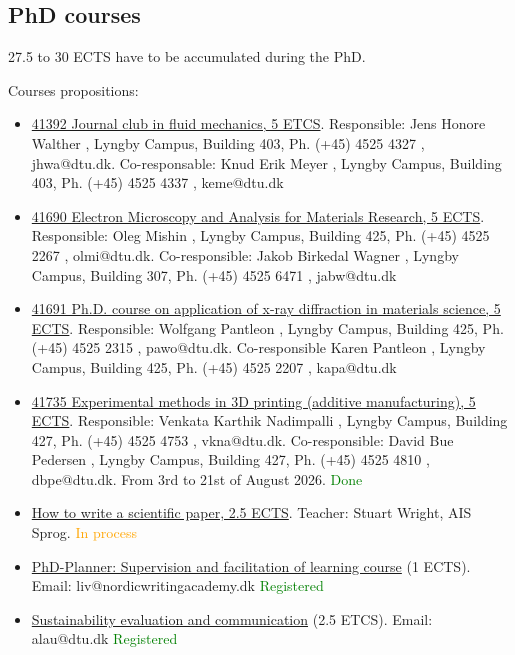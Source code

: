 \documentclass[../main.tex]{subfiles}
\begin{document}
\subsection{PhD courses}

27.5 to 30 ECTS have to be accumulated during the PhD.

Courses propositions:
\begin{itemize}
    \item \href{https://kurser.dtu.dk/course/41392}{41392 Journal club in fluid mechanics, 5 ETCS}. Responsible: Jens Honore Walther , Lyngby Campus, Building 403, Ph. (+45) 4525 4327 , jhwa@dtu.dk. Co-responsable: 	Knud Erik Meyer , Lyngby Campus, Building 403, Ph. (+45) 4525 4337 , keme@dtu.dk
    
    \item \href{https://kurser.dtu.dk/course/41690}{41690 Electron Microscopy and Analysis for Materials Research, 5 ECTS}. Responsible: 	Oleg Mishin , Lyngby Campus, Building 425, Ph. (+45) 4525 2267 , olmi@dtu.dk. Co-responsible: 	Jakob Birkedal Wagner , Lyngby Campus, Building 307, Ph. (+45) 4525 6471 , jabw@dtu.dk
    
    \item \href{https://kurser.dtu.dk/course/41691}{41691 Ph.D. course on application of x-ray diffraction in materials science, 5 ECTS}. Responsible: 	Wolfgang Pantleon , Lyngby Campus, Building 425, Ph. (+45) 4525 2315 , pawo@dtu.dk. Co-responsible	Karen Pantleon , Lyngby Campus, Building 425, Ph. (+45) 4525 2207 , kapa@dtu.dk
    
    \item \href{https://kurser.dtu.dk/course/41735}{41735 Experimental methods in 3D printing (additive manufacturing), 5 ECTS}. Responsible: 		Venkata Karthik Nadimpalli , Lyngby Campus, Building 427, Ph. (+45) 4525 4753 , vkna@dtu.dk. Co-responsible: David Bue Pedersen , Lyngby Campus, Building 427, Ph. (+45) 4525 4810 , dbpe@dtu.dk. From 3rd to 21st of August 2026. \textcolor{green}{Done}
    
    \item \href{https://employeecourses.dtu.dk/en/hr/administrative-staff/how-to-write-a-scientific-paper-2/}{How to write a scientific paper, 2.5 ECTS}. Teacher: Stuart Wright, AIS Sprog. \textcolor{orange}{In process}
    
    \item \href{https://app.researchplanner.net/RP/index.cfm?PortalId=16596}{PhD-Planner: Supervision and facilitation of learning course} (1 ECTS). Email: liv@nordicwritingacademy.dk
    \textcolor{green}{Registered}
    
    \item \href{https://kurser.dtu.dk/course/2026-2027/12950}{Sustainability evaluation and communication} (2.5 ETCS). Email: alau@dtu.dk \textcolor{green}{Registered}
\end{itemize}
\end{document}
